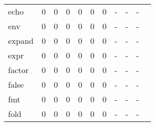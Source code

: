 \begin{longtable}{lp{1.10cm}p{1.10cm}p{1.10cm}p{1.10cm}p{1.10cm}p{1.10cm}p{1.10cm}p{1.10cm}p{1.10cm}p{1.10cm}}
echo      &                      0 &                                  0 &                                 0 &                                0 &                                 0 &                               0 &                              - &                                     - &                                   - \\
env       &                      0 &                                  0 &                                 0 &                                0 &                                 0 &                               0 &                              - &                                     - &                                   - \\
expand    &                      0 &                                  0 &                                 0 &                                0 &                                 0 &                               0 &                              - &                                     - &                                   - \\
expr      &                      0 &                                  0 &                                 0 &                                0 &                                 0 &                               0 &                              - &                                     - &                                   - \\
factor    &                      0 &                                  0 &                                 0 &                                0 &                                 0 &                               0 &                              - &                                     - &                                   - \\
false     &                      0 &                                  0 &                                 0 &                                0 &                                 0 &                               0 &                              - &                                     - &                                   - \\
fmt       &                      0 &                                  0 &                                 0 &                                0 &                                 0 &                               0 &                              - &                                     - &                                   - \\
fold      &                      0 &                                  0 &                                 0 &                                0 &                                 0 &                               0 &                              - &                                     - &                                   - \\

\end{longtable}

